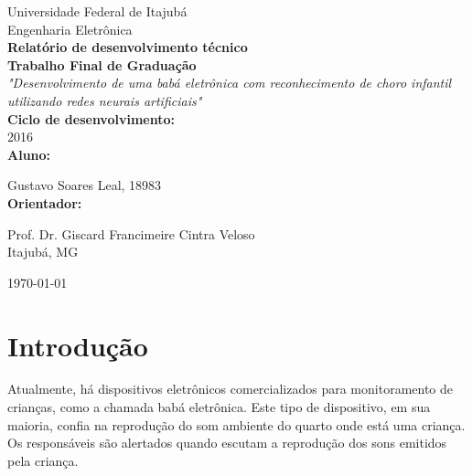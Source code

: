 \documentclass[a4paper, 12pt]{article}
\begin{document}
	\begin{titlepage}
		
		\newcommand{\HRule}{\rule{\linewidth}{0.5mm}} %
		
		\center %
		
		{\LARGE Universidade Federal de Itajubá}\\[0.2cm] %
		{\Large Engenharia Eletrônica}\\[5cm] %

		{ \huge \bfseries Relatório de desenvolvimento técnico}\\[0.5cm]
		 {\huge \bfseries Trabalho Final de Graduação}\\[2cm] %

		{\LARGE \textit {"Desenvolvimento de uma babá eletrônica com reconhecimento de choro infantil utilizando redes neurais artificiais"}}\\[2cm]
		{\large \bfseries Ciclo de desenvolvimento:}\\[0.1cm]
		{\large 2016}\\[1.3cm]
		
		{\large \bfseries Aluno:}
		
		{\large Gustavo Soares Leal, 18983}\\[1.8cm]
		
		{\large \bfseries Orientador:}
		
		{\large Prof. Dr. Giscard Francimeire Cintra Veloso}\\[1.3cm]
		\vfill
		{\large Itajubá, MG} 
		
	
		{\large \today}\\[1.5cm] %
		 
		
	\end{titlepage}

\tableofcontents
\newpage
	
	\section{Introdução}
		Atualmente, há dispositivos eletrônicos comercializados para monitoramento de crianças, como a chamada babá eletrônica. Este tipo de  dispositivo, em sua maioria, confia na reprodução do som ambiente do quarto onde está uma criança. Os responsáveis são alertados quando escutam a reprodução dos sons emitidos pela criança.
		
\end{document}
